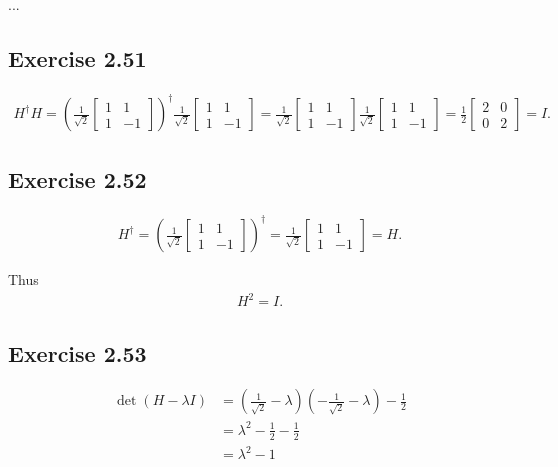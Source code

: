\documentclass[a4paper,12pt]{article}
\begin{document}
...



\subsection*{Exercise 2.51}
\begin{align*}
	H^\dagger H = \left(\frac{1}{\sqrt{2}} \begin{bmatrix}
	1 & 1 \\
	1 & -1
	\end{bmatrix}\right)^\dagger
	\frac{1}{\sqrt{2}} \begin{bmatrix}
	1 & 1 \\
	1 & -1
	\end{bmatrix}
	=
	\frac{1}{\sqrt{2}} \begin{bmatrix}
	1 & 1 \\
	1 & -1
	\end{bmatrix}
	\frac{1}{\sqrt{2}} \begin{bmatrix}
	1 & 1 \\
	1 & -1
	\end{bmatrix}
	=
	\frac{1}{2} \begin{bmatrix}
	2 & 0 \\
	0 & 2
	\end{bmatrix}
	=
	I.
\end{align*}




\subsection*{Exercise 2.52}
\begin{align*}
	H^\dagger = \left(\frac{1}{\sqrt{2}} \begin{bmatrix}
	1 & 1 \\
	1 & -1
	\end{bmatrix}\right)^\dagger
	=
	\frac{1}{\sqrt{2}} \begin{bmatrix}
	1 & 1 \\
	1 & -1
	\end{bmatrix}
	=
	H.
\end{align*}

Thus
\begin{align*}
	H^2 = I.
\end{align*}



\subsection*{Exercise 2.53}
\begin{align*}
	\det \left(H - \lambda I\right) &= \left(\frac{1}{\sqrt{2}} - \lambda \right) \left(- \frac{1}{\sqrt{2}} - \lambda \right) - \frac{1}{2}\\
		&= \lambda^2 - \frac{1}{2} - \frac{1}{2}\\
		&= \lambda^2 - 1
\end{align*}
\end{document}
